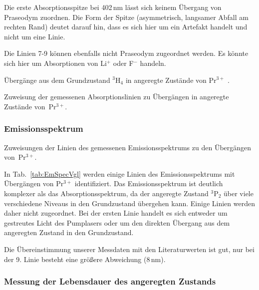 Die erste Absorptionsspitze bei 402\,nm lässt sich keinem Übergang von Praseodym zuordnen.
Die Form der Spitze (asymmetrisch, langsamer Abfall am rechten Rand) deutet darauf hin,
dass es sich hier um ein Artefakt handelt und nicht um eine Linie.

Die Linien 7-9 können ebenfalls nicht Praseodym zugeordnet werden.
Es könnte sich hier um Absorptionen von Li$^+$ oder F$^-$ handeln.


\begin{table}[htb]
\caption{Übergänge aus dem Grundzustand $^3$H$_4$ in angeregte Zustände von Pr$^{3+}$
\cite{NIST_ASD}.}

\label{tab:AbsSpecTh}
\end{table}

\begin{table}[htb]
\caption{Zuweisung der gemessenen Absorptionslinien zu Übergängen in angeregte Zustände
von~Pr$^{3+}$.}

\label{tab:AbsSpecVgl}
\end{table}

\FloatBarrier

\subsubsection{Emissionsspektrum}

\begin{table}[htb]
\caption{Zuweisungen der Linien des gemessenen Emissionsspektrums zu den Übergängen von~Pr$^{3+}$.}

\label{tab:EmSpecVgl}
\end{table}

In Tab.~\ref{tab:EmSpecVgl} werden einige Linien des Emissionsspektrums mit Übergängen von Pr$^{3+}$
identifiziert.
Das Emissionsspektrum ist deutlich komplexer als das Absorptionsspektrum,
da der angeregte Zustand $^3$P$_2$ über viele verschiedene Niveaus in den Grundzustand übergehen
kann.
Einige Linien werden daher nicht zugeordnet.
Bei der ersten Linie handelt es sich entweder um gestreutes Licht des Pumplasers oder um den
direkten Übergang aus dem angeregten Zustand in den Grundzustand.

Die Übereinstimmung unserer Messdaten mit den Literaturwerten ist gut,
nur bei der 9. Linie besteht eine größere Abweichung (8\,nm).



\subsubsection{Messung der Lebensdauer des angeregten Zustands}

